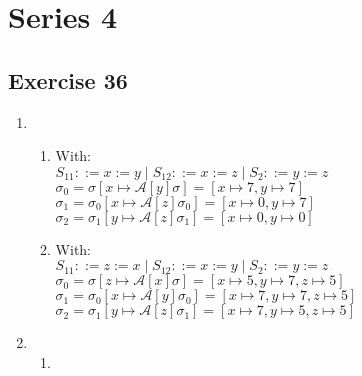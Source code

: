 \documentclass[12pt,fleqn]{article}		%
\begin{document}
\section{Series 4}
\subsection{Exercise 36}
\begin{enumerate}
\item
\begin{enumerate}
\item
\begin{prooftree}
\end{prooftree}
With:\\
$ S_{11} ::= x := y \mid S_{12} ::= x := z \mid S_2 ::= y := z $\\
$ \sigma_0 = \sigma[x \mapsto \mathcal{A}[y]\sigma] = [x \mapsto 7, y \mapsto 7] $\\
$ \sigma_1 = \sigma_0[x \mapsto \mathcal{A}[z]\sigma_0] = [x \mapsto 0, y \mapsto 7] $\\
$ \sigma_2 = \sigma_1[y \mapsto \mathcal{A}[z]\sigma_1] = [x \mapsto 0, y \mapsto 0] $
\item
\begin{prooftree}
\end{prooftree}
With:\\
$ S_{11} ::= z := x \mid S_{12} ::= x := y \mid S_2 ::= y := z $\\
$ \sigma_0 = \sigma[z \mapsto \mathcal{A}[x]\sigma] = [x \mapsto 5, y \mapsto 7, z \mapsto 5] $\\
$ \sigma_1 = \sigma_0[x \mapsto \mathcal{A}[y]\sigma_0] = [x \mapsto 7, y \mapsto 7, z \mapsto 5] $\\
$ \sigma_2 = \sigma_1[y \mapsto \mathcal{A}[z]\sigma_1] = [x \mapsto 7, y \mapsto 5, z \mapsto 5] $
\end{enumerate}
\item
\begin{enumerate}
\item

\end{enumerate}
\end{enumerate}
\end{document}
